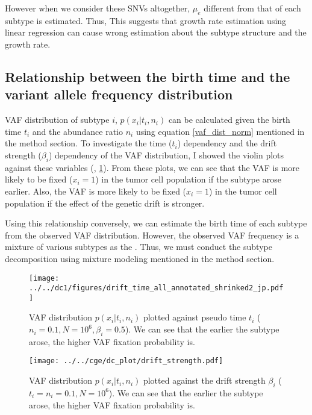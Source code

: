\documentclass{article}
\begin{document}
However when we consider these SNVs altogether, $\mu_e$ different from that of each subtype is estimated. Thus, This suggests that growth rate estimation using linear regression can cause wrong estimation about the subtype structure and the growth rate.

\subsection{Relationship between the birth time and the variant allele frequency distribution}
VAF distribution of subtype $i$, $p(x_i | t_i, n_i)$ can be calculated given the birth time $t_i$ and the abundance ratio $n_i$ using equation \eqref{vaf_dist_norm} mentioned in the method section. To investigate the time ($t_i$) dependency and the drift strength ($\beta_i$) dependency of the VAF distribution, I showed the violin plots against these variables (, \ref{vaf_against_strength}). From these plots, we can see that the VAF is more likely to be fixed ($x_i = 1$) in the tumor cell population if the subtype arose earlier. Also, the VAF is more likely to be fixed ($x_i = 1$) in the tumor cell population if the effect of the genetic drift is stronger.

Using this relationship conversely, we can estimate the birth time of each subtype from the observed VAF distribution.
However, the observed VAF frequency is a mixture of various subtypes as the .
Thus, we must conduct the subtype decomposition using mixture modeling mentioned in the method section.

\begin{figure}[H]
 \begin{minipage}[c]{0.47\hsize}
 \begin{center}
  \texttt{[image: ../../dc1/figures/drift\_time\_all\_annotated\_shrinked2\_jp.pdf]}
 \end{center}
    \caption{
  VAF distribution $p(x_i | t_i, n_i)$ plotted against pseudo time $t_i$ ($n_i=0.1, N=10^6, \beta_i=0.5$).
  We can see that the earlier the subtype arose, the higher VAF fixation probability is.
  }
    \label{fig: vaf_against_time}
\end{minipage}
 \hspace{1truecm}
\begin{minipage}[c]{0.47\hsize}
 \begin{center}
\texttt{[image: ../../cge/dc\_plot/drift\_strength.pdf]}
 \end{center}
   \caption{
 VAF distribution $p(x_i | t_i, n_i)$ plotted against the drift strength $\beta_i$ ($t_i= n_i=0.1, N=10^6$).
 We can see that the earlier the subtype arose, the higher VAF fixation probability is.
  }
   \label{vaf_against_strength}
\end{minipage}
\end{figure}
\end{document}
